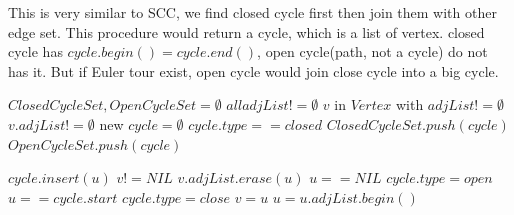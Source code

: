 \documentclass[]{article}
\begin{document}
This is very similar to SCC, we find closed cycle first then join them with other edge set. This procedure would return a cycle, which is a list of vertex. closed cycle has $cycle.begin() = cycle.end()$, open cycle(path, not a cycle) do not has it. But if Euler tour exist, open cycle would join close cycle into a big cycle.

\begin{codebox}
	
	\li $ClosedCycleSet, OpenCycleSet = \emptyset$
	\li \While $all adjList != \emptyset$ \Do
	\li \For $v$ in $Vertex$ with $adjList != \emptyset$\Do
	\li \If $v.adjList != \emptyset$ \Then
	\li new $cycle = \emptyset$
	\li {}
	\li \If $cycle.type == closed$
	\li \Then $ClosedCycleSet.push(cycle)$
	\li \Else $OpenCycleSet.push(cycle)$
	
\end{codebox}

\begin{codebox}
	
	\li $cycle.insert(u)$
	\li \If $v != NIL$ 
	\li \Then $v.adjList.erase(u)$ \End
	\li \If $u == NIL$ 
	\li \Then $cycle.type = open$
	\li \Return  
	\li \ElseIf $u == cycle.start$ 
	\li \Then $cycle.type = close$
	\li \Return 
	\li \Else $v = u$
	\li $u = u.adjList.begin()$
	\li {}
	\End
	\End
	
\end{codebox}
\end{document}
